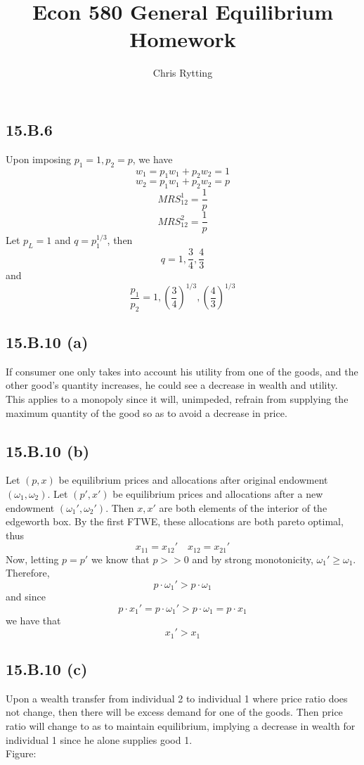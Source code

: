 \documentclass[letterpaper,12pt]{article}
\theoremstyle{definition}
\begin{document}
\title{Econ 580 General Equilibrium Homework}
\author{Chris Rytting}
\maketitle

\subsection*{15.B.6}
Upon imposing $p_1 = 1, p_2 = p$,
we have
\[ w_1 = p_1 w_1 + p_2 w_2 = 1 \]
\[ w_2 = p_1 w_1 + p_2 w_2 = p \]
\[MRS_{12}^1 = \frac{1}{p}\]
\[MRS_{12}^2 = \frac{1}{p}\]
Let $p_L = 1$ and $q = p_1^{1/3}$, then
\[q = 1, \frac{3}{4}, \frac{4}{3}\]
and
\[ \frac{p_1}{p_2} = 1, \left( \frac{3}{4} \right)^{1/3}, \left( \frac{4}{3} \right)^{1/3}\]

\subsection*{15.B.10 (a)}
If consumer one only takes into account his utility from one of the goods, and the other good's quantity increases, he could see a decrease in wealth and utility. This applies to a monopoly since it will, unimpeded, refrain from supplying the maximum quantity of the good so as to avoid a decrease in price.
\subsection*{15.B.10 (b)}
Let $(p,x)$ be equilibrium prices and allocations after original endowment $(\omega_1, \omega_2)$. Let $(p',x')$ be equilibrium prices and allocations after a new endowment $(\omega_1', \omega_2')$. Then $x,x'$ are both elements of the interior of the edgeworth box. By the first FTWE, these allocations are both pareto optimal, thus \[x_{11} = x_{12}' \quad x_{12} = x_{21}'\] Now, letting $p=p'$ we know that $p>>0$ and by strong monotonicity, $\omega_1' \geq \omega_1$. Therefore,  \[p\cdot \omega_1' > p\cdot \omega_1\] 
and since \[p\cdot x_1' = p\cdot \omega_1' > p\cdot \omega_1 = p\cdot x_1\] we have that \[x_1' > x_1\]
\subsection*{15.B.10 (c)}
Upon a wealth transfer from individual 2 to individual 1 where price ratio does not change, then there will be excess demand for one of the goods. Then price ratio will change to as to maintain equilibrium, implying a decrease in wealth for individual 1 since he alone supplies good 1.\\
Figure:
\\\\\\\\\\\\\\\\\\
\end{document}
